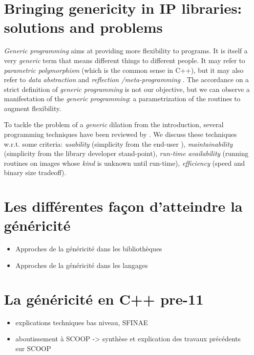 \section{Bringing genericity in IP libraries: solutions and problems}
\label{sec.state.of.the.art}

\emph{Generic programming} aims at providing more flexibility to programs. It is
itself a very \emph{generic} term that means different things to different
people. It may refer to \emph{parametric polymorphism} (which is the common
sense in C++), but it may also refer to \emph{data abstraction} and
\emph{reflection /meta-programming} \citep{gibbons2007datatype}. The accordance
on a strict definition of \emph{generic programming} is not our objective, but
we can observe a manifestation of the \emph{generic programming}: a
parametrization of the routines to augment flexibility.

To tackle the problem of a \emph{generic} dilation from the introduction,
several programming techniques have been reviewed by \citet{levillain.14.ciarp,
  geraud.12.hdr}. We discuss these techniques w.r.t. some criteria:
\emph{usability} (simplicity from the end-user ), \emph{maintainability}
(simplicity from the library developer stand-point), \emph{run-time
  availability} (running routines on images whose \emph{kind} is unknown until
run-time), \emph{efficiency} (speed and binary size tradeoff).


\section{Les différentes façon d'atteindre la généricité}

\begin{itemize}
  \item Approches de la généricité dans les bibliothèques
  \item Approches de la généricité dans les langages
\end{itemize}

\section{La généricité en C++ pre-11}

\begin{itemize}
  \item explications techniques bas niveau, SFINAE
  \item aboutissement à SCOOP -> synthèse et explication des travaux précédents sur SCOOP
\end{itemize}


